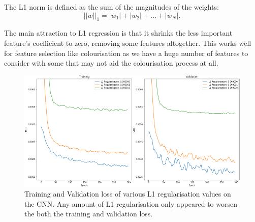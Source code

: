 \documentclass{l4proj}
\begin{document}
The L1 norm is defined as the sum of the magnitudes of the weights:
\begin{equation}
    ||w||_{1} = |w_{1}| + |w_{2}| + ... + |w_{N}|.
\end{equation}

The main attraction to L1 regression is that it shrinks the less important feature’s coefficient to zero, removing some features altogether. This works well for feature selection like colourisation as we have a huge number of features to consider with some that may not aid the colourisation process at all.
\begin{figure}[H]
    \centering
    \includegraphics[width=0.9\linewidth]{images/L1Regularisation.PNG}    

    \caption{Training and Validation loss of various L1 regularisation values on the CNN. Any amount of L1 regularisation only appeared to worsen the both the training and validation loss.}

    \label{fig:l1regularisation} 
\end{figure}
\end{document}

